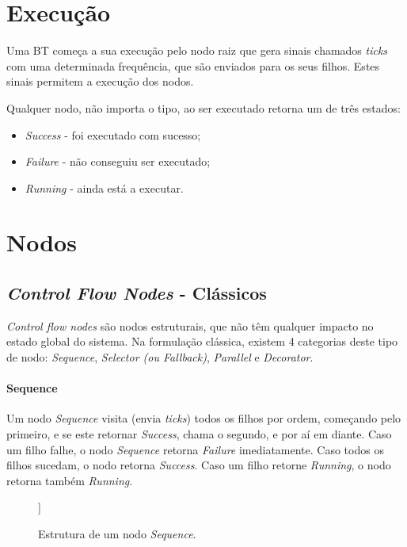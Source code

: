 \section{Execução}
Uma BT começa a sua execução pelo nodo raiz que gera sinais chamados \textit{ticks} com uma determinada frequência, que são enviados para os seus filhos.
Estes sinais permitem a execução dos nodos.

Qualquer nodo, não importa o tipo, ao ser executado retorna um de três estados: 
\begin{itemize}
    \item \textit{Success} - foi executado com sucesso;
    \item \textit{Failure} - não conseguiu ser executado;
    \item \textit{Running} - ainda está a executar.
\end{itemize}




\section{Nodos}

\subsection{\textit{Control Flow Nodes} - Clássicos}
\textit{Control flow nodes} são nodos estruturais, que não têm qualquer impacto no estado global do sistema.
Na formulação clássica, existem 4 categorias deste tipo de nodo: \textit{Sequence}, \textit{Selector (ou Fallback)}, \textit{Parallel} e \textit{Decorator}.

\paragraph{Sequence}{
    Um nodo \textit{Sequence} visita (envia \textit{ticks}) todos os filhos por ordem, começando pelo primeiro, e se este retornar \textit{Success}, chama o segundo, e por aí em diante.
    Caso um filho falhe, o nodo \textit{Sequence} retorna \textit{Failure} imediatamente.
    Caso todos os filhos sucedam, o nodo retorna \textit{Success}.
    Caso um filho retorne \textit{Running}, o nodo retorna também \textit{Running}.

    \begin{figure}[H]
    \centering
    \begin{behavior}
        [\memorysequence
            [\action{Child 1}]
            [\action{Child 2}]
            [{\textbf{. . .}}, inner sep=10pt]
            [\action{Child N}]
        ]
    \end{behavior}
    \caption{Estrutura de um nodo \textit{Sequence}.}
    \label{fig:2.2}
    \end{figure}
}


